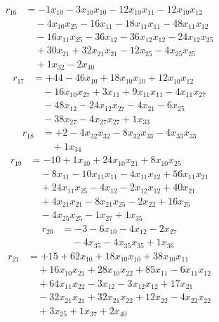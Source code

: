 \[\begin{aligned}
r_{16} &= - 1 x_{10} - 3 x_{10} x_{10} - 12 x_{10} x_{11} - 12 x_{10} x_{12} \\
 &\quad - 4 x_{10} x_{25} - 16 x_{11} - 18 x_{11} x_{11} - 48 x_{11} x_{12} \\
 &\quad - 16 x_{11} x_{25} - 36 x_{12} - 36 x_{12} x_{12} - 24 x_{12} x_{25} \\
 &\quad + 30 x_{21} + 32 x_{21} x_{21} - 12 x_{25} - 4 x_{25} x_{25} \\
 &\quad + 1 x_{32} - 2 x_{40}
\end{aligned}\]
\[\begin{aligned}
r_{17} &= + 44 - 46 x_{10} + 18 x_{10} x_{10} + 12 x_{10} x_{12} \\
 &\quad - 16 x_{10} x_{27} + 3 x_{11} + 9 x_{11} x_{11} - 4 x_{11} x_{27} \\
 &\quad - 48 x_{12} - 24 x_{12} x_{27} - 4 x_{21} - 6 x_{25} \\
 &\quad - 38 x_{27} - 4 x_{27} x_{27} + 1 x_{33}
\end{aligned}\]
\[\begin{aligned}
r_{18} &= + 2 - 4 x_{32} x_{32} - 8 x_{32} x_{33} - 4 x_{33} x_{33} \\
 &\quad + 1 x_{34}
\end{aligned}\]
\[\begin{aligned}
r_{19} &= - 10 + 1 x_{10} + 24 x_{10} x_{21} + 8 x_{10} x_{25} \\
 &\quad - 8 x_{11} - 10 x_{11} x_{11} - 4 x_{11} x_{12} + 56 x_{11} x_{21} \\
 &\quad + 24 x_{11} x_{25} - 4 x_{12} - 2 x_{12} x_{12} + 40 x_{21} \\
 &\quad + 4 x_{21} x_{21} - 8 x_{21} x_{25} - 2 x_{22} + 16 x_{25} \\
 &\quad - 4 x_{25} x_{25} - 1 x_{27} + 1 x_{35}
\end{aligned}\]
\[\begin{aligned}
r_{20} &= - 3 - 6 x_{10} - 4 x_{12} - 2 x_{27} \\
 &\quad - 4 x_{35} - 4 x_{35} x_{35} + 1 x_{36}
\end{aligned}\]
\[\begin{aligned}
r_{21} &= + 15 + 62 x_{10} + 18 x_{10} x_{10} + 38 x_{10} x_{11} \\
 &\quad + 16 x_{10} x_{21} + 28 x_{10} x_{22} + 85 x_{11} - 6 x_{11} x_{12} \\
 &\quad + 64 x_{11} x_{22} - 3 x_{12} - 3 x_{12} x_{12} + 17 x_{21} \\
 &\quad - 32 x_{21} x_{21} + 32 x_{21} x_{22} + 12 x_{22} - 4 x_{22} x_{22} \\
 &\quad + 3 x_{25} + 1 x_{37} + 2 x_{40}
\end{aligned}\]

